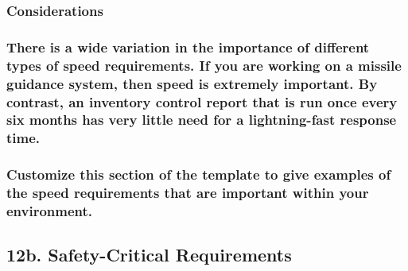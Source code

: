 \documentclass[
]{article}
\begin{document}
\hypertarget{considerations-25}{%
\subsubsection{Considerations}\label{considerations-25}}

\hypertarget{there-is-a-wide-variation-in-the-importance-of-different-types-of-speed-requirements.-if-you-are-working-on-a-missile-guidance-system-then-speed-is-extremely-important.-by-contrast-an-inventory-control-report-that-is-run-once-every-six-months-has-very-little-need-for-a-lightning-fast-response-time.}{%
\subsubsection{\texorpdfstring{There is a wide variation in the
importance of different types of speed requirements. If you are working
on a missile guidance system, then speed is extremely important. By
contrast, an inventory control report that is run once every six months
has very little need for a lightning-fast response time.
}{There is a wide variation in the importance of different types of speed requirements. If you are working on a missile guidance system, then speed is extremely important. By contrast, an inventory control report that is run once every six months has very little need for a lightning-fast response time. }}\label{there-is-a-wide-variation-in-the-importance-of-different-types-of-speed-requirements.-if-you-are-working-on-a-missile-guidance-system-then-speed-is-extremely-important.-by-contrast-an-inventory-control-report-that-is-run-once-every-six-months-has-very-little-need-for-a-lightning-fast-response-time.}}

\hypertarget{customize-this-section-of-the-template-to-give-examples-of-the-speed-requirements-that-are-important-within-your-environment.}{%
\subsubsection{Customize this section of the template to give examples
of the speed requirements that are important within your
environment.}\label{customize-this-section-of-the-template-to-give-examples-of-the-speed-requirements-that-are-important-within-your-environment.}}

\hypertarget{b.-safety-critical-requirements}{%
\subsection{12b. Safety-Critical
Requirements}\label{b.-safety-critical-requirements}}
\end{document}
